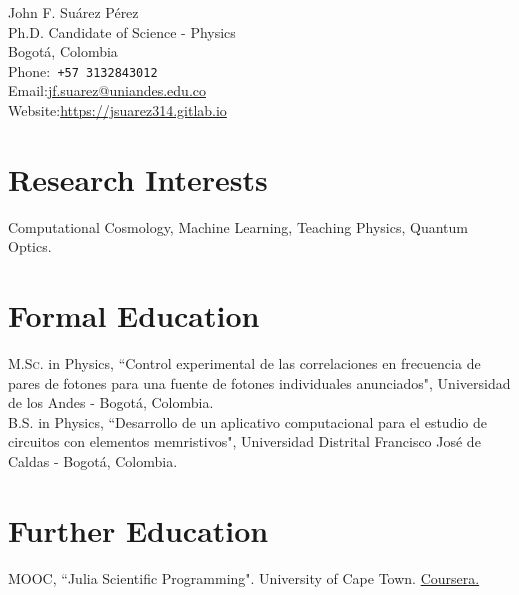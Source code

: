 \documentclass[10pt, a4paper]{article}
\newcommand{\years}[1]{\marginnote{\scriptsize #1}}
\begin{document}
{\LARGE John F. Suárez Pérez}\\[1cm]
Ph.D. Candidate of Science - Physics \\
Bogotá, Colombia\\[.2cm]
Phone:\hspace{0.2cm}\texttt{ +57 3132843012 }\\
Email:\hspace{0.5cm}\href{mailto:jf.suarez@uniandes.edu.co}{jf.suarez@uniandes.edu.co}\\
Website:\hspace{0.16cm}\href{https://jsuarez314.gitlab.io}{https://jsuarez314.gitlab.io}


\section*{Research Interests}
Computational Cosmology, Machine Learning, Teaching Physics, Quantum Optics.

\section*{Formal Education}
\noindent
\years{2018}\textsc{M.Sc.} in Physics, “Control experimental de las correlaciones en frecuencia de pares de fotones para una fuente de fotones individuales anunciados", Universidad de los Andes - Bogotá, Colombia.\\

\years{2014}\textsc{B.S.} in Physics, “Desarrollo de un aplicativo computacional para el estudio de circuitos con elementos memristivos", Universidad Distrital Francisco José de Caldas - Bogotá, Colombia.\\


\section*{Further Education}
\noindent
\years{2021}\textsc{MOOC}, “Julia Scientific Programming". University of Cape Town. \href{https://coursera.org/share/faa0fcc877c44d0c38b6a2c4179818f2}{Coursera.}\\
\end{document}
